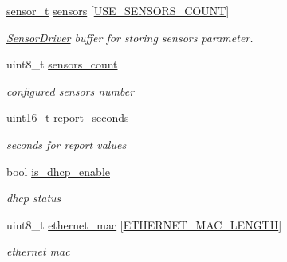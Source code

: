 \begin{DoxyCompactItemize}
\hyperlink{structsensor__t}{sensor\+\_\+t} \hyperlink{structconfiguration__t_adede74f3da6d26f5bc4b5e64e4776f7f}{sensors} \mbox{[}\hyperlink{rmap-config_8h_af18dc3de744722cb308451b7a705611b}{U\+S\+E\+\_\+\+S\+E\+N\+S\+O\+R\+S\+\_\+\+C\+O\+U\+NT}\mbox{]}
\begin{DoxyCompactList}\small\item\em \hyperlink{classSensorDriver}{Sensor\+Driver} buffer for storing sensors parameter. \end{DoxyCompactList}\item 
\mbox{\label{structconfiguration__t_a9a1e7c702c2dd7270f31aca29264db86}} 
uint8\+\_\+t \hyperlink{structconfiguration__t_a9a1e7c702c2dd7270f31aca29264db86}{sensors\+\_\+count}
\begin{DoxyCompactList}\small\item\em configured sensors number \end{DoxyCompactList}\item 
\mbox{\label{structconfiguration__t_a0c0dc512cf86464d2e8dad486e042c5c}} 
uint16\+\_\+t \hyperlink{structconfiguration__t_a0c0dc512cf86464d2e8dad486e042c5c}{report\+\_\+seconds}
\begin{DoxyCompactList}\small\item\em seconds for report values \end{DoxyCompactList}\item 
\mbox{\label{structconfiguration__t_a04554256dd43582433092cd70dd8b87d}} 
bool \hyperlink{structconfiguration__t_a04554256dd43582433092cd70dd8b87d}{is\+\_\+dhcp\+\_\+enable}
\begin{DoxyCompactList}\small\item\em dhcp status \end{DoxyCompactList}\item 
\mbox{\label{structconfiguration__t_a6ade77826c87e62532cae8ca0f045dac}} 
uint8\+\_\+t \hyperlink{structconfiguration__t_a6ade77826c87e62532cae8ca0f045dac}{ethernet\+\_\+mac} \mbox{[}\hyperlink{ethernet__config_8h_aafad911924144dbfc03b66b146ed4439}{E\+T\+H\+E\+R\+N\+E\+T\+\_\+\+M\+A\+C\+\_\+\+L\+E\+N\+G\+TH}\mbox{]}
\begin{DoxyCompactList}\small\item\em ethernet mac \end{DoxyCompactList}\item 

\end{DoxyCompactItemize}
